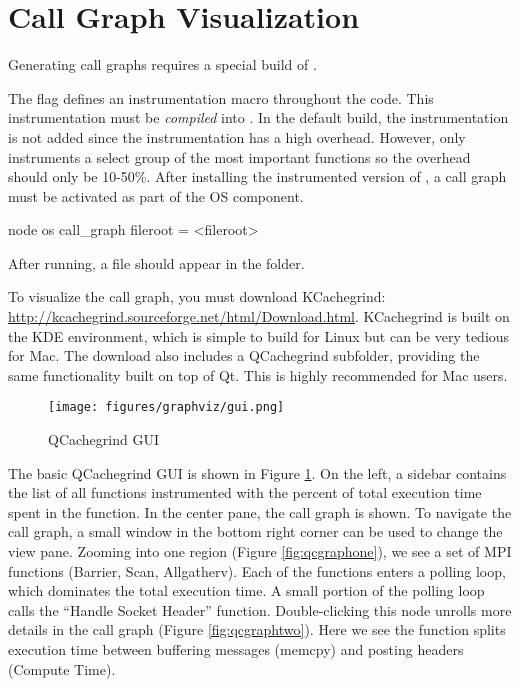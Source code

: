 

\section{Call Graph Visualization}
\label{sec:tutorials:callgraph}
Generating call graphs requires a special build of \sstmacro.

The  flag defines an instrumentation macro throughout the \sstmacro code.
This instrumentation must be \emph{compiled} into \sstmacro.
In the default build, the instrumentation is not added since the instrumentation has a high overhead.
However, \sstmacro only instruments a select group of the most important functions so the overhead should only be 10-50\%.
After installing the instrumented version of \sstmacro, a call graph must be activated as part of the OS component.

\begin{ViFile}
node {
  os {
    call_graph {
      fileroot = <fileroot>
    }
  }
}
\end{ViFile}
After running, a  file should appear in the folder.

To visualize the call graph, you must download KCachegrind: \url{http://kcachegrind.sourceforge.net/html/Download.html}.
KCachegrind is built on the KDE environment, which is simple to build for Linux but can be very tedious for Mac.
The download also includes a QCachegrind subfolder, providing the same functionality built on top of Qt.  
This is highly recommended for Mac users.

\begin{figure}[h]
\centering
\texttt{[image: figures/graphviz/gui.png]}
\caption{QCachegrind GUI}
\label{fig:qcgui}
\end{figure}

The basic QCachegrind GUI is shown in Figure \ref{fig:qcgui}.  
On the left, a sidebar contains the list of all functions instrumented with the percent of total execution time spent in the function.
In the center pane, the call graph is shown.  
To navigate the call graph, a small window in the bottom right corner can be used to change the view pane.
Zooming into one region (Figure \ref{fig:qcgraphone}), we see a set of MPI functions (Barrier, Scan, Allgatherv).
Each of the functions enters a polling loop, which dominates the total execution time.  
A small portion of the polling loop calls the ``Handle Socket Header'' function.
Double-clicking this node unrolls more details in the call graph (Figure \ref{fig:qcgraphtwo}).
Here we see the function splits execution time between buffering messages (memcpy) and posting headers (Compute Time).

